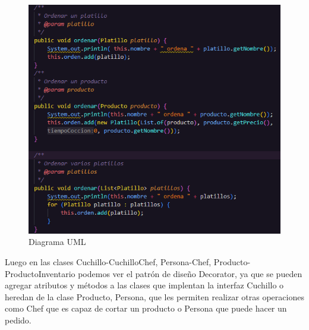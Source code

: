 \documentclass{article}
\begin{document}
\begin{figure}[h]
    \centering
    \includegraphics[width=\textwidth]{codigoPersona.png}
    \caption{Diagrama UML}
    \label{fig:UML}
\end{figure}

Luego en las clases Cuchillo-CuchilloChef, Persona-Chef, Producto-ProductoInventario podemos ver el patrón de diseño Decorator, ya que se pueden agregar atributos y métodos a las clases que implentan la interfaz Cuchillo o heredan de la clase Producto, Persona, que les permiten realizar otras operaciones como Chef que es capaz de cortar un producto o Persona que puede hacer un pedido.
\end{document}
